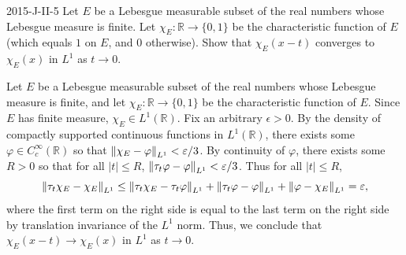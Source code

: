 \documentclass{article}
\begin{document}
	\begin{prb}{2015-J-II-5}
		Let $E$ be a Lebesgue measurable subset of the real numbers whose Lebesgue measure is finite. Let $\chi_E: \mathbb{R} \to \{0,1\}$ be the characteristic function of $E$ (which equals $1$ on $E$, and $0$ otherwise). Show that $\chi_E(x-t)$ converges to $\chi_E(x)$ in $L^1$ as $t \to 0$. 
	\end{prb}
	Let $E$ be a Lebesgue measurable subset of the real numbers whose Lebesgue measure is finite, and let $\chi_{E}: \mathbb{R} \to \{0,1\}$ be the characteristic function of $E$. Since $E$ has finite measure, $\chi_{E} \in L^{1}(\mathbb{R})$. Fix an arbitrary $\epsilon > 0$. By the density of compactly supported continuous functions in $L^{1}(\mathbb{R})$, there exists some $\varphi \in C_{c}^{\infty}(\mathbb{R})$ so that $\left\Vert \chi_E - \varphi \right\Vert_{L^1} < \varepsilon/3$. By continuity of $\varphi$, there exists some $R > 0$ so that for all $|t|\leq R$, $\left\Vert \tau_{t}\varphi - \varphi \right\Vert_{L^1} < \varepsilon/3$. Thus for all $|t| \leq R$, 
	\begin{equation*}
		\left\Vert \tau_{t}\chi_{E} - \chi_{E} \right\Vert_{L^1} \leq \left\Vert \tau_{t}\chi_{E} - \tau_t\varphi \right\Vert_{L^1} + \left\Vert \tau_{t}\varphi - \varphi \right\Vert_{L^1} + \left\Vert \varphi - \chi_{E} \right\Vert_{L^1} = \varepsilon, 
	\end{equation*}
	where the first term on the right side is equal to the last term on the right side by translation invariance of the $L^1$ norm. Thus, we conclude that $\chi_{E}(x - t) \to \chi_{E}(x)$ in $L^1$ as $t \to 0$. 
	
\end{document}
